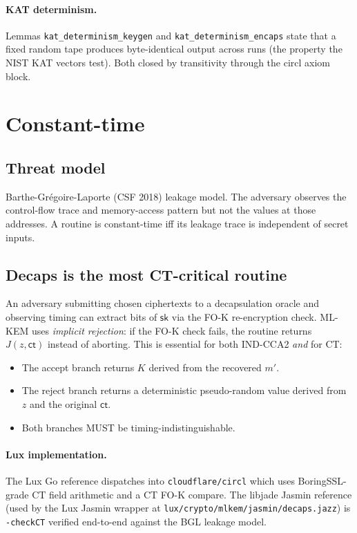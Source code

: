 \documentclass[11pt,a4paper]{article}
\begin{document}
\paragraph{KAT determinism.} Lemmas
\texttt{kat\_determinism\_keygen} and
\texttt{kat\_determinism\_encaps} state that a fixed random tape
produces byte-identical output across runs (the property the
NIST KAT vectors test). Both closed by transitivity through the
circl axiom block.

\section{Constant-time}\label{sec:ct}

\subsection{Threat model}

Barthe-Gr\'egoire-Laporte (CSF 2018) leakage model. The adversary
observes the control-flow trace and memory-access pattern but not
the values at those addresses. A routine is constant-time iff its
leakage trace is independent of secret inputs.

\subsection{Decaps is the most CT-critical routine}

An adversary submitting chosen ciphertexts to a decapsulation
oracle and observing timing can extract bits of $\mathsf{sk}$ via
the FO-K re-encryption check. ML-KEM uses \emph{implicit
rejection}: if the FO-K check fails, the routine returns
$J(z, \mathsf{ct})$ instead of aborting. This is essential for
both IND-CCA2 \emph{and} for CT:
\begin{itemize}
\item The accept branch returns $K$ derived from the recovered $m'$.
\item The reject branch returns a deterministic pseudo-random
  value derived from $z$ and the original $\mathsf{ct}$.
\item Both branches MUST be timing-indistinguishable.
\end{itemize}

\paragraph{Lux implementation.} The Lux Go reference dispatches
into \texttt{cloudflare/circl} which uses BoringSSL-grade CT field
arithmetic and a CT FO-K compare. The libjade Jasmin reference
(used by the Lux Jasmin wrapper at
\texttt{lux/crypto/mlkem/jasmin/decaps.jazz}) is
\texttt{-checkCT} verified end-to-end against the BGL leakage
model.
\end{document}
